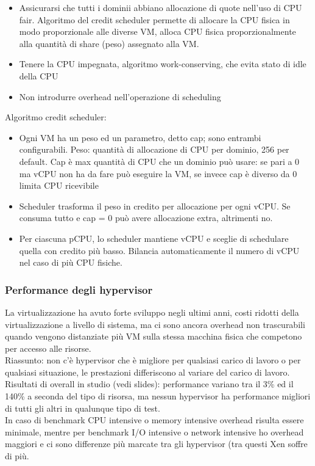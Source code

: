 \documentclass[16px]{article}
\begin{document}
\begin{itemize}
\item Assicurarsi che tutti i dominii abbiano allocazione di quote nell'uso di CPU fair. Algoritmo del credit scheduler permette di allocare la CPU fisica in modo proporzionale alle diverse VM, alloca CPU fisica proporzionalmente alla quantità di share (peso) assegnato alla VM.
\item Tenere la CPU impegnata, algoritmo work-conserving, che evita stato di idle della CPU
\item Non introdurre overhead nell'operazione di scheduling
\end{itemize}
Algoritmo credit scheduler:
\begin{itemize}
\item Ogni VM ha un peso ed un parametro, detto cap; sono entrambi configurabili. Peso: quantità di allocazione di CPU per dominio, 256 per default. Cap è max quantità di CPU che un dominio può usare: se pari a 0 ma vCPU non ha da fare può eseguire la VM, se invece cap è diverso da 0 limita CPU ricevibile
\item Scheduler trasforma il peso in credito per allocazione per ogni vCPU. Se consuma tutto e cap = 0 può avere allocazione extra, altrimenti no.
\item Per ciascuna pCPU, lo scheduler mantiene vCPU e sceglie di schedulare quella con credito più basso. Bilancia automaticamente il numero di vCPU nel caso di più CPU fisiche.
\end{itemize}
\subsubsection{Performance degli hypervisor}
La virtualizzazione ha avuto forte sviluppo negli ultimi anni, costi ridotti della virtualizzazione a livello di sistema, ma ci sono ancora overhead non trascurabili quando vengono distanziate più VM sulla stessa macchina fisica che competono per accesso alle risorse.\\ Riassunto: non c'è hypervisor che è migliore per qualsiasi carico di lavoro o per qualsiasi situazione, le prestazioni differiscono al variare del carico di lavoro.\\ Risultati di overall in studio (vedi slides): performance variano tra il 3\% ed il 140\% a seconda del tipo di risorsa, ma nessun hypervisor ha performance migliori di tutti gli altri in qualunque tipo di test.\\ In caso di benchmark CPU intensive o memory intensive overhead risulta essere minimale, mentre per benchmark I/O intensive o network intensive ho overhead maggiori e ci sono differenze più marcate tra gli hypervisor (tra questi Xen soffre di più.
\end{document}
